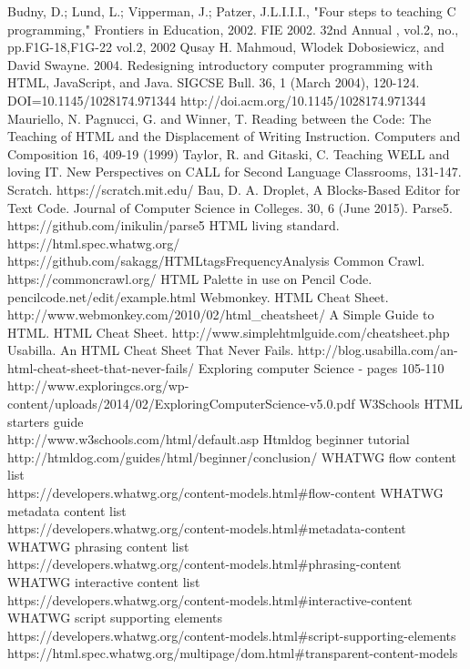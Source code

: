 \documentclass[conference]{IEEEtran}
\begin{document}
\begin{thebibliography}{1}

  Budny, D.; Lund, L.; Vipperman, J.; Patzer, J.L.I.I.I., "Four steps to teaching C programming," Frontiers in Education, 2002. FIE 2002. 32nd Annual , vol.2, no., pp.F1G-18,F1G-22 vol.2, 2002
  Qusay H. Mahmoud, Wlodek Dobosiewicz, and David Swayne. 2004. Redesigning introductory computer programming with HTML, JavaScript, and Java. SIGCSE Bull. 36, 1 (March 2004), 120-124. DOI=10.1145/1028174.971344 http://doi.acm.org/10.1145/1028174.971344
  Mauriello, N. Pagnucci, G. and Winner, T. Reading between the Code: The Teaching of HTML and the Displacement of Writing Instruction. Computers and Composition 16, 409-19 (1999)
  Taylor, R. and Gitaski, C. Teaching WELL and loving IT. New Perspectives on CALL for Second Language Classrooms, 131-147.
  Scratch. https://scratch.mit.edu/
  Bau, D. A. Droplet, A Blocks-Based Editor for Text Code. Journal of Computer Science in Colleges. 30, 6 (June 2015).
  Parse5. https://github.com/inikulin/parse5
  HTML living standard. https://html.spec.whatwg.org/
  https://github.com/sakagg/HTMLtagsFrequencyAnalysis
  Common Crawl. https://commoncrawl.org/
  HTML Palette in use on Pencil Code. pencilcode.net/edit/example.html
  Webmonkey. HTML Cheat Sheet. http://www.webmonkey.com/2010/02/html\_cheatsheet/
  A Simple Guide to HTML. HTML Cheat Sheet. http://www.simplehtmlguide.com/cheatsheet.php
  Usabilla. An HTML Cheat Sheet That Never Fails. http://blog.usabilla.com/an-html-cheat-sheet-that-never-fails/
  Exploring computer Science - pages 105-110\\
  http://www.exploringcs.org/wp-content/uploads/2014/02/ExploringComputerScience-v5.0.pdf
  W3Schools HTML starters guide\\
  http://www.w3schools.com/html/default.asp
  Htmldog beginner tutorial http://htmldog.com/guides/html/beginner/conclusion/
  WHATWG flow content list\\
  https://developers.whatwg.org/content-models.html\#flow-content
  WHATWG metadata content list\\
  https://developers.whatwg.org/content-models.html\#metadata-content
  WHATWG phrasing content list\\
  https://developers.whatwg.org/content-models.html\#phrasing-content
  WHATWG interactive content list\\
  https://developers.whatwg.org/content-models.html\#interactive-content
  WHATWG script supporting elements\\
  https://developers.whatwg.org/content-models.html\#script-supporting-elements
  https://html.spec.whatwg.org/multipage/dom.html\#transparent-content-models

\end{thebibliography}

\end{document}
